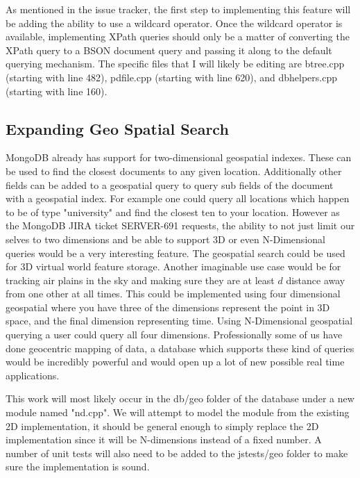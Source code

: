 \documentclass{dependencies/acm_proc_article-sp}
\begin{document}
As mentioned in the issue tracker, the first step to implementing this feature will be adding the ability to use a wildcard operator. Once the wildcard operator is available, implementing XPath queries should only be a matter of converting the XPath query to a BSON document query and passing it along to the default querying mechanism. The specific files that I will likely be editing are btree.cpp (starting with line 482), pdfile.cpp (starting with line 620), and dbhelpers.cpp (starting with line 160).

\subsection{Expanding Geo Spatial Search}
MongoDB already has support for two-dimensional geospatial indexes.
These can be used to find the closest documents to any given location.
Additionally other fields can be added to a geospatial query to query sub fields
of the document with a geospatial index. For example one could query all locations
which happen to be of type "university" and find the closest ten to your location.
However as the MongoDB JIRA ticket SERVER-691 \cite{9} requests, the ability to
not just limit our selves to two dimensions and be able to support 3D or even N-Dimensional
queries would be a very interesting feature. The geospatial search could be used for
3D virtual world feature storage. Another imaginable use case would be for tracking air plains
in the sky and making sure they are at least $d$ distance away from one other at all times.
This could be implemented using four dimensional geospatial where you have three of the dimensions
represent the point in 3D space, and the final dimension representing time. Using N-Dimensional
geospatial querying a user could query all four dimensions. Professionally some of us have done geocentric mapping of
data, a database which supports these kind of queries would be incredibly powerful and would open up a lot of new
possible real time applications.

This work will most likely occur in the db/geo folder of the database under a new module named "nd.cpp". We will
attempt to model the module from the existing 2D implementation, it should be general enough to simply replace
the 2D implementation since it will be N-dimensions instead of a fixed number. A number of unit tests will also
need to be added to the jstests/geo folder to make sure the implementation is sound.
%

%
%
\balancecolumns
\end{document}
